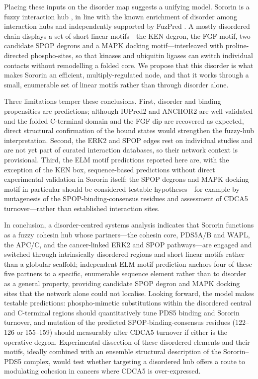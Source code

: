 \documentclass[11pt]{article}
\begin{document}
Placing these inputs on the disorder map suggests a unifying model. Sororin is a fuzzy interaction hub \citep{tompa2008,fuxreiter2018}, in line with the known enrichment of disorder among interaction hubs \citep{haynes2006} and independently supported by FuzPred \citep{miskei2020,horvath2020}. A mostly disordered chain displays a set of short linear motifs---the KEN degron, the FGF motif, two candidate SPOP degrons and a MAPK docking motif---interleaved with proline-directed phospho-sites, so that kinases and ubiquitin ligases can switch individual contacts without remodelling a folded core. We propose that this disorder is what makes Sororin an efficient, multiply-regulated node, and that it works through a small, enumerable set of linear motifs rather than through disorder alone.

Three limitations temper these conclusions. First, disorder and binding propensities are predictions; although IUPred2 and ANCHOR2 are well validated and the folded C-terminal domain and the FGF dip are recovered as expected, direct structural confirmation of the bound states would strengthen the fuzzy-hub interpretation. Second, the ERK2 and SPOP edges rest on individual studies and are not yet part of curated interaction databases, so their network context is provisional. Third, the ELM motif predictions reported here are, with the exception of the KEN box, sequence-based predictions without direct experimental validation in Sororin itself; the SPOP degrons and MAPK docking motif in particular should be considered testable hypotheses---for example by mutagenesis of the SPOP-binding-consensus residues and assessment of CDCA5 turnover---rather than established interaction sites.

In conclusion, a disorder-centred systems analysis indicates that Sororin functions as a fuzzy cohesin hub whose partners---the cohesin core, PDS5A/B and WAPL, the APC/C, and the cancer-linked ERK2 and SPOP pathways---are engaged and switched through intrinsically disordered regions and short linear motifs rather than a globular scaffold; independent ELM motif prediction anchors four of these five partners to a specific, enumerable sequence element rather than to disorder as a general property, providing candidate SPOP degron and MAPK docking sites that the network alone could not localise. Looking forward, the model makes testable predictions: phospho-mimetic substitutions within the disordered central and C-terminal regions should quantitatively tune PDS5 binding and Sororin turnover, and mutation of the predicted SPOP-binding-consensus residues (122--126 or 155--159) should measurably alter CDCA5 turnover if either is the operative degron. Experimental dissection of these disordered elements and their motifs, ideally combined with an ensemble structural description of the Sororin--PDS5 complex, would test whether targeting a disordered hub offers a route to modulating cohesion in cancers where CDCA5 is over-expressed.
\end{document}
